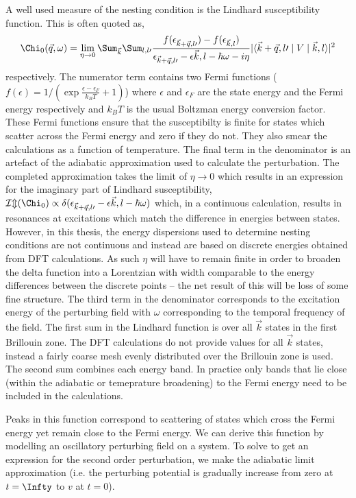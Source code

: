 A well used measure of the nesting condition is the Lindhard susceptibility function. This is often quoted as,
\begin{equation}
\Chi_0(\vec{q}, \omega) = \lim_{\eta \to 0} \Sum_{\vec{k}}\Sum_{l,l\prime}\frac{f(\epsilon_{\vec{k}+\vec{q},l\prime}) - f(\epsilon_{\vec{k},l})}{\epsilon_{\vec{k}+\vec{q},l\prime} - \epsilon{\vec{k},l} - \hbar\omega - i\eta}|\langle \vec{k}+\vec{q},l\prime \mid  V \mid \vec{k},l \rangle|^2
\end{equation}
respectively. The numerator term contains two Fermi functions ($f(\epsilon) = 1/(\exp{\frac{\epsilon - \epsilon_F}{k_B T}} + 1)$) where $\epsilon$ and $\epsilon_F$ are the state energy and the Fermi energy respectively and $k_BT$ is the usual Boltzman energy conversion factor. These Fermi functions ensure that the susceptibilty is finite for states which scatter across the Fermi energy and zero if they do not. They also smear the calculations as a function of temperature. The final term in the denominator is an artefact of the adiabatic approximation used to calculate the perturbation. The completed approximation takes the limit of $\eta \to 0$ which results in an expression for the imaginary part of Lindhard susceptibility, $\mathcal{Im}(\Chi_0) \propto \delta(\epsilon_{\vec{k}+\vec{q},l\prime} - \epsilon{\vec{k},l} - \hbar\omega)$ which, in a continuous calculation, results in resonances at excitations which match the difference in energies between states. However, in this thesis, the energy dispersions used to determine nesting conditions are not continuous and instead are based on discrete energies obtained from DFT calculations. As such $\eta$ will have to remain finite in order to broaden the delta function into a Lorentzian with width comparable to the energy differences between the discrete points -- the net result of this will be loss of some fine structure. The third term in the denominator corresponds to the excitation energy of the perturbing field with $\omega$ corresponding to the temporal frequency of the field. The first sum in the Lindhard function is over all $\vec{k}$ states in the first Brillouin zone. The DFT calculations do not provide values for all $\vec{k}$ states, instead a fairly coarse mesh evenly distributed over the Brillouin zone is used. The second sum combines each energy band. In practice only bands that lie close (within the adiabatic or temeprature broadening) to the Fermi energy need to be included in the calculations.

Peaks in this function correspond to scattering of states which cross the Fermi energy yet remain close to the Fermi energy.  We can derive this function by modelling an oscillatory perturbing field on a system. To solve to get an expression for the second order perturbation, we make the adiabatic limit approximation (i.e. the perturbing potential is gradually increase from zero at $t=\Infty$ to $v$ at $t=0$).

